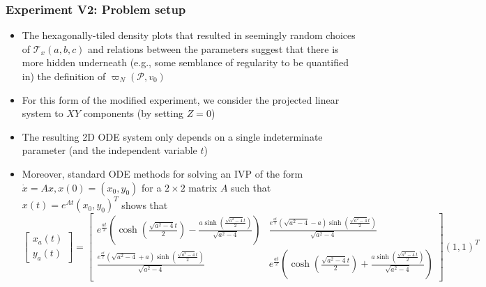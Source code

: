 \documentclass[usenames,svgnames,dvipsnames,10pt]{beamer}
\begin{document}
\begin{frame}
\frametitle{Experiment V2: Problem setup}

\begin{itemize} 

\item The hexagonally-tiled density plots that resulted in seemingly random choices of $\mathcal{T}_x(a, b, c)$ 
      and relations between the parameters suggest that there is more hidden underneath 
      (e.g., some semblance of regularity to be quantified in) the definition of 
      $\varpi_N(\mathcal{P}, v_0)$ 
\item For this form of the modified experiment, we consider the projected linear 
      system to $XY$ components (by setting $Z=0$) 
\item The resulting 2D ODE system only depends on a single indeterminate parameter 
      (and the independent variable $t$)
\item Moreover, standard ODE methods for solving an IVP of the form $\dot{x} = Ax, x(0)=(x_0, y_0)$ for a $2 \times 2$ 
      matrix $A$ such that $x(t) = e^{At} (x_0, y_0)^T$ shows that 
      {\tiny
      \[
      \begin{bmatrix}
      x_a(t) \\ y_a(t) 
      \end{bmatrix} = 
      \begin{bmatrix}
      e^{\frac{at}{2}}\left(\cosh\left(\frac{\sqrt{a^2-4} t}{2}\right) - 
           \frac{a \sinh\left(\frac{\sqrt{a^2-4} t}{2}\right)}{\sqrt{a^2-4}}\right) & 
      \frac{e^{\frac{at}{2}} \left(\sqrt{a^2-4}-a\right) \sinh\left(\frac{\sqrt{a^2-4} t}{2}\right)}{\sqrt{a^2-4}} \\ 
      \frac{e^{\frac{at}{2}} \left(\sqrt{a^2-4}+a\right) \sinh\left(\frac{\sqrt{a^2-4} t}{2}\right)}{\sqrt{a^2-4}} & 
      e^{\frac{at}{2}}\left(\cosh\left(\frac{\sqrt{a^2-4} t}{2}\right) + 
           \frac{a \sinh\left(\frac{\sqrt{a^2-4} t}{2}\right)}{\sqrt{a^2-4}}\right) 
      \end{bmatrix} (1, 1)^T
      \]
      }

\end{itemize}

\end{frame}
\end{document}
